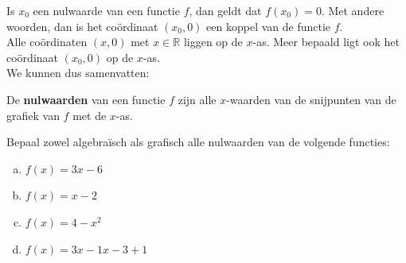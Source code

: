 \documentclass[12pt,a4paper,twoside]{article}
\begin{document}
\begin{minipage}{0.5\textwidth}
  Is $x_0$ een nulwaarde van een functie $f$, dan geldt dat $f(x_0)=0$. Met andere woorden, dan is het coördinaat $(x_0,0)$ een koppel van de functie $f$.\\

  Alle coördinaten $(x,0)$ met $x\in\mathbb{R}$ liggen op de $x$-as. Meer bepaald ligt ook het coördinaat $(x_0,0)$ op de $x$-as.\\

  We kunnen dus samenvatten:
\end{minipage}
\begin{minipage}{0.5\textwidth}
  \begin{center}
  \end{center}
\end{minipage}

De {\bf nulwaarden} van een functie $f$ zijn alle $x$-waarden van de snijpunten van de grafiek van $f$ met de $x$-as.

\begin{oefening}
  Bepaal zowel algebraïsch als grafisch alle nulwaarden van de volgende functies:
  \begin{enumerate}[(a)]
  \itemsep.5em
  \item $f(x)=3x-6$
  \item $f(x)=x-2$
  \item $f(x)=4-x^2$
  \item $f(x)=3x-1x-3+1$
  \end{enumerate}
\end{oefening}
\end{document}
